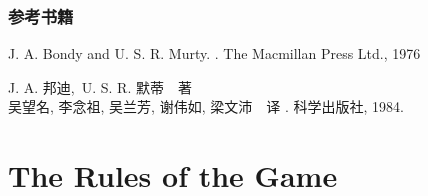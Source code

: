 \documentclass[serif,envcountsect]{beamer}
\begin{document}
\begin{frame}\frametitle{参考书籍}
\begin{thebibliography}{10}
\beamertemplatebookbibitems
{}
J. A. Bondy  and  U. S. R. Murty.
.
\newblock The Macmillan Press Ltd., 1976

J. A. 邦迪,~U. S. R. 默蒂~~著\\
吴望名, 李念祖, 吴兰芳, 谢伟如, 梁文沛~~译
.
\newblock 科学出版社, 1984.
\end{thebibliography}
\end{frame}
\section{The Rules of the Game}
\end{document}
